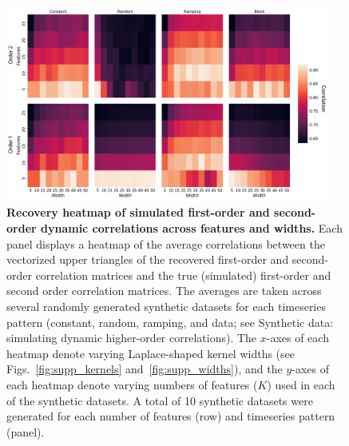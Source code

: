 \documentclass[english]{article}
\begin{document}
\begin{figure}[p!]
\centering
\includegraphics[width=0.95\textwidth]{figs/sim_heatmaps_features}
  \caption{\textbf{Recovery heatmap of simulated first-order and
      second-order dynamic correlations across features and widths.}  Each panel displays a
    heatmap of the average correlations
    between the vectorized upper triangles of the recovered
    first-order and second-order correlation matrices and the true
    (simulated) first-order and second order correlation matrices.
    The averages are taken across several randomly generated
    synthetic datasets for each timeseries pattern (constant, random,
    ramping, and data; see Synthetic data: simulating dynamic higher-order
      correlations).  The $x$-axes of each heatmap denote varying
    Laplace-shaped kernel widths (see Figs.~\ref{fig:supp_kernels}
    and~\ref{fig:supp_widths}), and the $y$-axes of each heatmap
    denote varying numbers of features ($K$) used in each of the synthetic datasets.
    A total of 10 synthetic datasets were generated for each number of features
    (row) and timeseries pattern (panel).}
\label{fig:features}
\end{figure}
\end{document}
